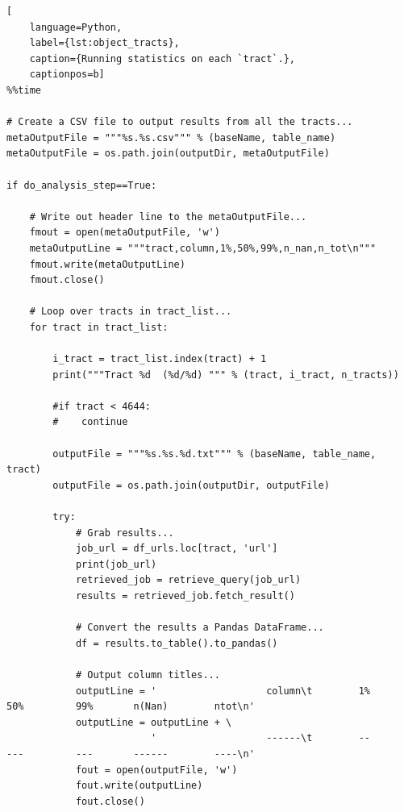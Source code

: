 \documentclass[DM,authoryear,toc]{lsstdoc}
\begin{document}
\clearpage

\begin{lstlisting}[
    language=Python,
    label={lst:object_tracts},
    caption={Running statistics on each `tract`.},
    captionpos=b]
%%time

# Create a CSV file to output results from all the tracts...
metaOutputFile = """%s.%s.csv""" % (baseName, table_name)
metaOutputFile = os.path.join(outputDir, metaOutputFile)

if do_analysis_step==True:

    # Write out header line to the metaOutputFile...
    fmout = open(metaOutputFile, 'w')
    metaOutputLine = """tract,column,1%,50%,99%,n_nan,n_tot\n"""
    fmout.write(metaOutputLine)
    fmout.close()

    # Loop over tracts in tract_list...
    for tract in tract_list:
    
        i_tract = tract_list.index(tract) + 1
        print("""Tract %d  (%d/%d) """ % (tract, i_tract, n_tracts))
        
        #if tract < 4644:
        #    continue

        outputFile = """%s.%s.%d.txt""" % (baseName, table_name, tract)
        outputFile = os.path.join(outputDir, outputFile)
    
        try:
            # Grab results...
            job_url = df_urls.loc[tract, 'url']
            print(job_url)
            retrieved_job = retrieve_query(job_url)
            results = retrieved_job.fetch_result()
    
            # Convert the results a Pandas DataFrame...
            df = results.to_table().to_pandas()

            # Output column titles...
            outputLine = '                   column\t        1%         50%         99%       n(Nan)        ntot\n'
            outputLine = outputLine + \
                         '                   ------\t        --         ---         ---       ------        ----\n'
            fout = open(outputFile, 'w')
            fout.write(outputLine)
            fout.close()
    

\end{lstlisting}
\end{document}
